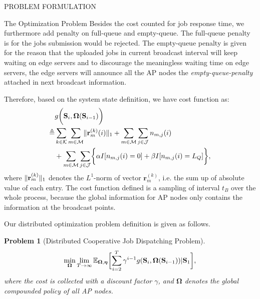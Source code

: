 \documentclass[10pt, conference, letterpaper]{IEEEtran}
\newtheorem{problem}{Problem}
\newcommand{\define}{\triangleq}
\newcommand{\vecG}{\boldsymbol}
\renewcommand{\vec}{\mathbf}
\DeclarePairedDelimiter{\Inorm}{\|}{\|_1}
\DeclarePairedDelimiter{\Paren}{\bigg(}{\bigg)}
\DeclarePairedDelimiter{\Bracket}{\bigg[}{\bigg]}
\DeclarePairedDelimiter{\Brace}{\bigg\{}{\bigg\}}
\newcommand{\apSet}{\mathcal{K}}
\newcommand{\esSet}{\mathcal{M}}
\newcommand{\jSpace}{\mathcal{J}}
\newcommand{\Stat}{\mathbf{S}}
\newcommand{\Policy}{\mathbf{\Omega}}
\begin{document}
\begin{section}{PROBLEM FORMULATION}
\begin{subsection}{The Optimization Problem}
            Besides the cost counted for job response time, we furthermore add penalty on full-queue and empty-queue.
            The full-queue penalty is for the jobs submission would be rejected.
            {\color{red}The empty-queue penalty is given for the reason that the uploaded jobs in current broadcast interval will keep waiting on edge servers and to discourage the meaningless waiting time on edge servers, the edge servers will announce all the AP nodes the \emph{empty-queue-penalty} attached in next broadcast information.}

            Therefore, based on the system state definition, we have cost function as:
            \begin{align}
                &g\Paren{\Stat_{i}, \Policy(\Stat_{i-1})}
                \nonumber\\
                \define& \sum_{k\in\apSet}\sum_{m\in\esSet} \Inorm{\vec{r}^{(k)}_{m}(i)} +
                        \sum_{m\in\esSet}\sum_{j\in\jSpace} n_{m,j}(i)
                        \nonumber\\
                        &+\sum_{m\in\esSet}\sum_{j\in\jSpace} \Brace{
                            \alpha I[n_{m,j}(i)=0] + \beta I[n_{m,j}(i)=L_Q]
                        },
            \end{align}
            where $\Inorm{\vec{r}^{(k)}_{m}}$ denotes the $L^1$-norm of vector $\vec{r}^{(k)}_{m}$, i.e. the sum up of absolute value of each entry. The cost function defined is a sampling of interval $t_B$ over the whole process, because the global information for AP nodes only contains the information at the broadcast points.

            Our distributed optimization problem definition is given as follows.
            \begin{problem}[Distributed Cooperative Job Dispatching Problem]
                \begin{gather}
                    \min_{\Policy} \lim_{T \to \infty}
                        \mathbb{E}_{\Policy, \vecG{\eta}}
                            \Bracket{\sum_{i=2}^{T} \gamma^{i-1} g(\Stat_{i}, \Policy(\Stat_{i-1}))|\Stat_1},
                \end{gather}
                where the cost is collected with a discount factor $\gamma$, and $\Policy$ denotes the global compounded policy of all AP nodes.
            \end{problem}


\end{subsection}
\end{section}
\end{document}
